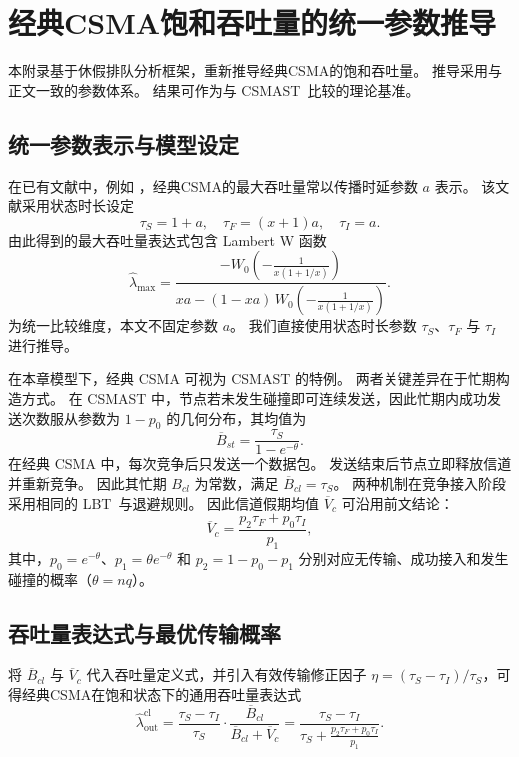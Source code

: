 \chapter{经典CSMA饱和吞吐量的统一参数推导}
\label{app:classic_csma}

本附录基于休假排队分析框架，重新推导经典CSMA的饱和吞吐量。
推导采用与正文一致的参数体系。
结果可作为与 CSMAST~比较的理论基准。

\section{统一参数表示与模型设定}

在已有文献中，例如 \cite{2013_DaiCSMA}，经典CSMA的最大吞吐量常以传播时延参数 $a$ 表示。
该文献采用状态时长设定
$$
\tau_S=1+a,\quad \tau_F=(x+1)a,\quad \tau_I=a.
$$
由此得到的最大吞吐量表达式包含 Lambert W 函数
\begin{equation}
	\hat{\lambda}_{\text{max}} = \frac{-W_{0}\left(-\frac{1}{x(1+1/x)}\right)}{xa-(1-xa)\,W_{0}\left(-\frac{1}{x(1+1/x)}\right)}.
\end{equation}
为统一比较维度，本文不固定参数 $a$。
我们直接使用状态时长参数 $\tau_S$、$\tau_F$ 与 $\tau_I$ 进行推导。

在本章模型下，经典 CSMA 可视为 CSMAST 的特例。
两者关键差异在于忙期构造方式。
在 CSMAST 中，节点若未发生碰撞即可连续发送，因此忙期内成功发送次数服从参数为 $1-p_0$ 的几何分布，其均值为
$$
\overline{B}_{st}=\frac{\tau_S}{1-e^{-\theta}}.
$$
在经典 CSMA 中，每次竞争后只发送一个数据包。
发送结束后节点立即释放信道并重新竞争。
因此其忙期 $B_{cl}$ 为常数，满足 $\overline{B}_{cl}=\tau_S$。
两种机制在竞争接入阶段采用相同的 LBT~与退避规则。
因此信道假期均值 $\overline{V}_c$ 可沿用前文结论：
\begin{equation}
	\overline{V}_c = \frac{p_{2}\tau_{F}+p_{0}\tau_{I}}{p_{1}},
\end{equation}
其中，$p_0 = e^{-\theta}$、$p_1 = \theta e^{-\theta}$ 和 $p_2 = 1 - p_0 - p_1$ 分别对应无传输、成功接入和发生碰撞的概率（$\theta = nq$）。

\section{吞吐量表达式与最优传输概率}

将 $\overline{B}_{cl}$ 与 $\overline{V}_c$ 代入吞吐量定义式，并引入有效传输修正因子 $\eta=(\tau_S-\tau_I)/\tau_S$，可得经典CSMA在饱和状态下的通用吞吐量表达式
\begin{equation}
	\label{eq:classic_csma_throughput}
	\hat{\lambda}_{\text{out}}^{\text{cl}} = \frac{\tau_{S}-\tau_{I}}{\tau_{S}} \cdot \frac{\overline{B}_{cl}}{\overline{B}_{cl}+\overline{V}_{c}} = \frac{\tau_{S}-\tau_{I}}{\tau_{S}+\frac{p_{2}\tau_{F}+p_{0}\tau_{I}}{p_{1}}}.
\end{equation}

